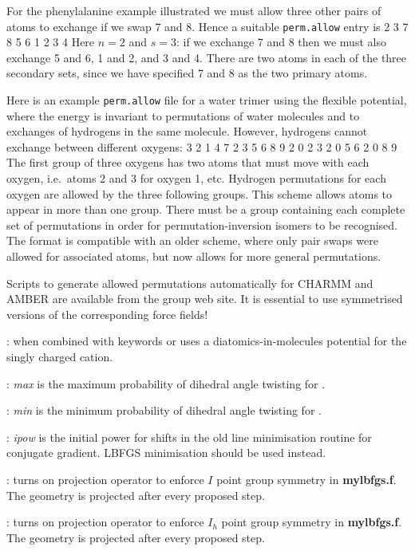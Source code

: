 For the phenylalanine example illustrated we must allow three other pairs of
atoms to exchange if we swap 7 and 8. Hence a suitable {\tt perm.allow} entry is
{
2 3
7 8 5 6 1 2 3 4
}
Here $n=2$ and $s=3$: if we exchange 7 and 8 then we must also exchange 5 and 6,
1 and 2, and 3 and 4. There are two atoms in each of the three secondary sets, 
since we have specified 7 and 8 as the two primary atoms.

Here is an example {\tt perm.allow} file for a water trimer using
the flexible {\/} potential, where the energy is invariant to permutations
of water molecules and to exchanges of hydrogens in the same molecule. However,
hydrogens cannot exchange between different oxygens:
{
3 2
1 4 7 2 3 5 6 8 9
2 0 
2 3
2 0 
5 6
2 0 
8 9
}
The first group of three oxygens has two atoms that must move with each oxygen,
i.e.~atoms 2 and 3 for oxygen 1, etc. Hydrogen permutations for each oxygen are
allowed by the three following groups. This scheme allows atoms to appear in more 
than one group. There must be a group containing each complete set of permutations
in order for permutation-inversion isomers to be recognised. The format
is compatible with an older scheme, where only pair swaps were allowed for
associated atoms, but now allows for more general permutations.

Scripts to generate allowed permutations automatically for CHARMM and AMBER are available from
the group web site. It is essential to use symmetrised versions of the corresponding
force fields! 


: when combined with keywords {\/} or {\/}
uses a diatomics-in-molecules potential for the singly charged cation.

: {\it max\/} is the maximum probability of dihedral angle twisting for {\/}.

: {\it min\/} is the minimum probability of dihedral angle twisting for {\/}.

: {\it ipow\/} is the initial power for shifts in the old line minimisation routine
for conjugate gradient. LBFGS minimisation should be used instead.

: turns on projection operator to enforce $I$ point group symmetry
in {\bf mylbfgs.f}. The geometry is projected after every proposed step.

: turns on projection operator to enforce $I_h$ point group symmetry
in {\bf mylbfgs.f}. The geometry is projected after every proposed step.

